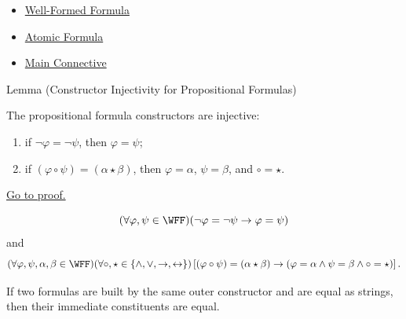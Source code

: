 \begin{dependencies}
\begin{itemize}
  \item \hyperref[def:well-formed-formula]{Well-Formed Formula}
  \item \hyperref[def:atomic-formula-propositional-logic]{Atomic Formula}
  \item \hyperref[def:main-connective-propositional-logic]{Main Connective}
\end{itemize}
\end{dependencies}
\begin{lemmabox}{Lemma (Constructor Injectivity for Propositional Formulas)}
\begin{lemma}
\label{lem:constructor-injectivity-propositional-formulas}
The propositional formula constructors are injective:
\begin{enumerate}
\item if \(\neg\varphi=\neg\psi\), then \(\varphi=\psi\);
\item if \((\varphi\circ\psi)=(\alpha\star\beta)\), then \(\varphi=\alpha\), \(\psi=\beta\), and \(\circ=\star\).
\end{enumerate}

\noindent\hyperref[prf:constructor-injectivity-propositional-formulas]{Go to proof.}
\end{lemma}
\end{lemmabox}

\begin{remark*}
\[
(\forall\varphi,\psi\in\WFF)
(\neg\varphi=\neg\psi\to\varphi=\psi)
\]
and
\[
(\forall\varphi,\psi,\alpha,\beta\in\WFF)
(\forall\circ,\star\in\{\land,\lor,\to,\leftrightarrow\})
\left[
(\varphi\circ\psi)=(\alpha\star\beta)
\to
(\varphi=\alpha\land\psi=\beta\land\circ=\star)
\right].
\]
\end{remark*}

\begin{remark*}[Interpretation]
If two formulas are built by the same outer constructor and are equal as strings, then their immediate constituents are equal.
\end{remark*}

